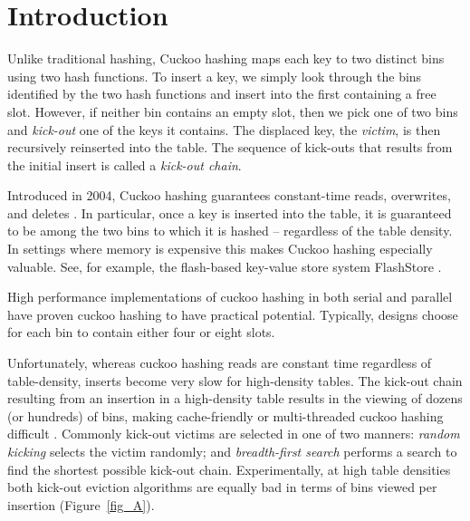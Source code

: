 \documentclass{sig-alternate-05-2015}
\begin{document}
\printccsdesc




\clearpage
\clearpage


\section{Introduction}


Unlike traditional hashing, Cuckoo hashing maps each key to two
distinct bins using two hash functions.  To insert a key, we simply
look through the bins identified by the two hash functions and insert
into the first containing a free slot. However, if neither bin
contains an empty slot, then we pick one of two bins and
\emph{kick-out} one of the keys it contains. The displaced key, the
\emph{victim}, is then recursively reinserted into the table. The
sequence of kick-outs that results from the initial insert is called a
\emph{kick-out chain}.

Introduced in 2004, Cuckoo hashing guarantees constant-time reads,
overwrites, and deletes \cite{cuckoo04}. In particular, once a key is
inserted into the table, it is guaranteed to be among the two bins to
which it is hashed -- regardless of the table density.  In settings
where memory is expensive this makes Cuckoo hashing especially
valuable. See, for example, the flash-based key-value store system
FlashStore \cite{flash10}.


High performance implementations of cuckoo hashing in both serial
\cite{ross07} and parallel \cite{fan13, li14} have proven cuckoo
hashing to have practical potential. Typically, designs choose for
each bin to contain either four or eight slots.

Unfortunately, whereas cuckoo hashing reads are constant time
regardless of table-density, inserts become very slow for high-density
tables. The kick-out chain resulting from an insertion in a
high-density table results in the viewing of dozens (or hundreds) of
bins, making cache-friendly or multi-threaded cuckoo hashing difficult
\cite{li14}. Commonly kick-out victims are selected in one of two
manners: \emph{random kicking} selects the victim randomly; and
\emph{breadth-first search} performs a search to find the shortest
possible kick-out chain. Experimentally, at high table densities both
kick-out eviction algorithms are equally bad in terms of bins viewed
per insertion (Figure~\ref{fig_A}).
\end{document}

